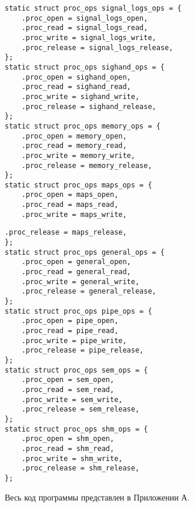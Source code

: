\begin{lstlisting}[label=lst:proc_ops, caption=Экземпляры структуры proc\_ops]			
static struct proc_ops signal_logs_ops = {
	.proc_open = signal_logs_open,
	.proc_read = signal_logs_read,
	.proc_write = signal_logs_write,
	.proc_release = signal_logs_release,
};
static struct proc_ops sighand_ops = {
	.proc_open = sighand_open,
	.proc_read = sighand_read,
	.proc_write = sighand_write,
	.proc_release = sighand_release,
};
static struct proc_ops memory_ops = {
	.proc_open = memory_open,
	.proc_read = memory_read,
	.proc_write = memory_write,
	.proc_release = memory_release,
};
static struct proc_ops maps_ops = {
	.proc_open = maps_open,
	.proc_read = maps_read,
	.proc_write = maps_write,
\end{lstlisting}	
\begin{lstlisting}[label=lst:proc_ops-2, caption=Экземпляры структуры proc\_ops]	
	.proc_release = maps_release,
};
static struct proc_ops general_ops = {
	.proc_open = general_open,
	.proc_read = general_read,
	.proc_write = general_write,
	.proc_release = general_release,
};
static struct proc_ops pipe_ops = {
	.proc_open = pipe_open,
	.proc_read = pipe_read,
	.proc_write = pipe_write,
	.proc_release = pipe_release,
};
static struct proc_ops sem_ops = {
	.proc_open = sem_open,
	.proc_read = sem_read,
	.proc_write = sem_write,
	.proc_release = sem_release,
};
static struct proc_ops shm_ops = {
	.proc_open = shm_open,
	.proc_read = shm_read,
	.proc_write = shm_write,
	.proc_release = shm_release,
};
\end{lstlisting}

Весь код программы представлен в Приложении А.